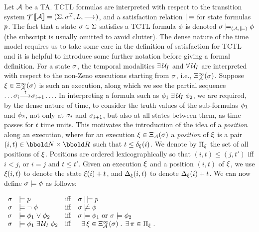 {Let $\AA$ be a TA. TCTL formulas are interpreted with respect to the
transition system $\TSys{\AA} = (\States,\Init,\Labels,\TRel)$, and
a satisfaction relation $\mathrel{|\!\models}$ for state formulas $p$. The
fact that a state $\sigma
\in \Sigma$ satisfies a TCTL formula $\phi$ is denoted 
$\state \models_{(\AA,\smodels)} \fmla$ (the subscript is usually
omitted to avoid clutter). The dense nature of the time model requires
us to take some care in the definition of satisfaction for TCTL and it
is helpful to introduce some further notation before giving a formal
definition. For a state $\sigma$, the temporal modalities
$\euntil{\I}$ and $\auntil{\I}$ are interpreted with respect to the
non-Zeno executions starting from $\sigma$, i.e.,
$\Execdiv_{\AA}(\state)$. Suppose $\exec \in
\Execdiv_{\AA}(\state)$ is such an execution, along which we see the
partial sequence $\ldots\sigma_i
{\mathrel{{\stackrel{t}{\longrightarrow_{\mathrm{{}}}}}}} \sigma_{i+1}\ldots$. In interpreting a formula such as 
$\fmla_1 \euntil{\I} \fmla_2$, we are required, by the dense nature of
time, to consider the truth values of the sub-formulas $\phi_1$ and
$\phi_2$, not only at $\sigma_i$ and $\sigma_{i+1}$, but also at all
states between them, as time passes for $t$ time units. This motivates
the introduction of the idea of a \emph{position} along an execution,
where for an execution $\exec \in \Exec_{\AA}(\state)$ a
\emph{position} of $\xi$ is a pair $(i,t) \in \nat \cross \Time$
such that $t \leq \mathop{\delta_{\xi}}(i)$.  We denote by $\Pi_\xi$ the
set of all positions of $\xi$. Positions are ordered
lexicographically so that $(i,t) \leq (j,t')$ iff $i < j$, or $i = j$
and $t \leq t'$. Given an execution $\xi$ and a position $(i,t)$ of
$\xi$, we use $\xi(i,t)$ to denote the state $\xi(i) + t$, and
$\mathop{\Delta_{\xi}}(i,t)$ to denote $\mathop{\Delta_{\xi}}(i) + t$. We
can now define $\sigma \models \phi$ as follows:
\begin{center}  
\begin{math}
\begin{array}{lll}
\state & \models \sfmla & \text{iff} \quad \state \smodels \sfmla \\ 
\state & \models \lnot \fmla & \text{iff} \quad \state \not\models \fmla \\
\state & \models \fmla_1 \lor \fmla_2 & \text{iff} \quad \state \models \fmla_1 \text{ or } \state \models \fmla_2 \\
\state & \models \fmla_1 \euntil{\I} \fmla_2 & \text{iff} \quad 
       \begin{array}[t]{l} \exists \exec \in
         \Execdiv_{\AA}(\state)\such \exists \pos \in \Pos_\exec \such

\end{array}
\end{array}
\end{math}
\end{center}}
